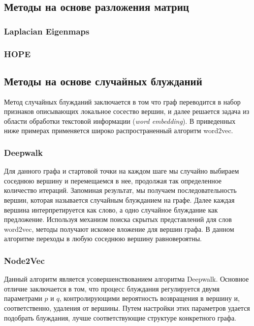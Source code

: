 \documentclass[12pt,a4paper]{extarticle}
\begin{document}
    \subsection{Методы на основе разложения матриц}
    \subsubsection{Laplacian Eigenmaps}
    \subsubsection{HOPE}
    
    \subsection{Методы на основе случайных блужданий}
    Метод случайных блужданий заключается в том что граф переводится в набор признаков описывающих локальное сосество вершин, и далее решается задача из области обработки текстовой информации (\textit{word embedding}). В приведенных ниже примерах применяется широко распространенный алгоритм word2vec.
    
    \subsubsection{Deepwalk}
    Для данного графа и стартовой точки на каждом шаге мы случайно выбираем соседнюю вершину и перемещаемся в нее, продолжая так определенное количество итераций.
    Запоминая результат, мы получаем последовательность вершин, которая называется случайным блужданием на графе.
    Далее каждая вершина интерпретируется как слово, а одно случайное блуждание как предложение.
    Используя механизм поиска скрытых представлений для слов word2vec, методы получают искомое вложение для вершин графа.
    В данном алгоритме переходы в любую соседнюю вершину равновероятны.
    
    \subsubsection{Node2Vec}
    Данный алгоритм является усовершенствованием алгоритма
    Deepwalk.
    Основное отличие заключается в том, что процесс блуждания регулируется двумя параметрами $p$ и $q$, контролирующими вероятность возвращения в вершину и, соответственно, удаления от вершины.
    Путем настройки этих параметров удается подобрать блуждания, лучше соответствующие структуре конкретного графа.
    
\end{document}
